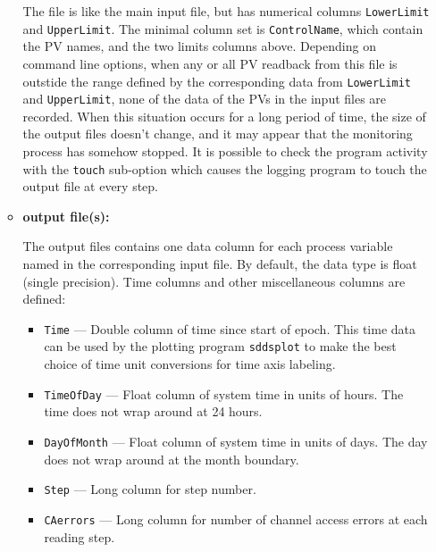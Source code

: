 \begin{itemize}
\begin{itemize}
The file is like the main input file, but has numerical columns \verb+LowerLimit+ and \verb+UpperLimit+.
The minimal column set is \verb+ControlName+, which contain the PV names, and the two limits columns above.
Depending on command line options, when any or all PV readback from this file
is outstide the range defined by the corresponding data from \verb+LowerLimit+ and \verb+UpperLimit+,
none of the data of the PVs in the input files are recorded. 
When this situation occurs for a long period of time, the size of the output files doesn't
change, and it may appear that the monitoring process has somehow stopped.
It is possible to check the program activity with the \verb+touch+ sub-option
which causes the logging program to touch the output file at every step.

\item {\bf output file(s):}\par
The output files contains one data column for each process variable named in the corresponding input file. By default,
the data type is float (single precision).
Time columns and other miscellaneous columns are defined: 
\begin{itemize}
        \item {\tt Time} --- Double column of time since start of epoch. This time data can be used by
        the plotting program {\verb+sddsplot+} to make the best choice of time unit conversions
        for time axis labeling.
        \item {\tt TimeOfDay} --- Float column of system time in units of hours. 
        The time does not wrap around at 24 hours.
        \item {\tt DayOfMonth} --- Float column of system time in units of days. 
        The day does not wrap around at the month boundary.
        \item {\tt Step} --- Long column for step number.
        \item {\tt CAerrors} --- Long column for number of channel access errors at each reading step. 
\end{itemize}


\end{itemize}
\end{itemize}
